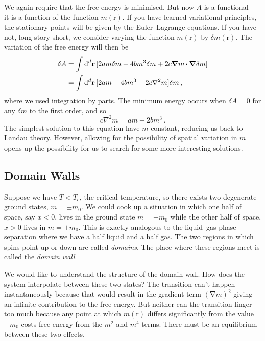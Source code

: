 \documentclass{article}
\theoremstyle{plain}\theoremheaderfont{\normalfont\bfseries}\theorembodyfont{\rmfamily}\theoremseparator{.}\newtheorem*{thm}{Theorem}\newtheorem*{law}{Law}\newtheorem*{pos}{Postulate}
\numberwithin{equation}{section}
\newcommand{\dd}[2][]{\mathrm{d}^{#1} #2\,}
\newcommand{\vb}[1]{\bm{\mathrm{#1}}}
\newcommand{\vdot}{\,\bm{\mathrm{\cdot}}\,}
\newcommand{\grad}{\vb{\nabla}}
\newcommand{\laplacian}{\nabla^2}
\begin{document}
    We again require that the free energy is minimised. But now \(A\) is a functional --- it is a function of the function \(m(\vb{r})\). If you have learned variational principles, the stationary points will be given by the Euler--Lagrange equations. If you have not, long story short, we consider varying the function \(m(\vb{r})\) by \(\delta m(\vb{r})\). The variation of the free energy will then be
    \begin{align}
        \delta A&=\int\dd[d]{\vb{r}}[2am\delta m+4bm^3\delta m+2c\grad m\vdot\grad\delta m]\notag \\
        &=\int\dd[d]{\vb{r}}[2am+4bm^3-2c\laplacian m]\delta m\,,
    \end{align}
    where we used integration by parts. The minimum energy occurs when \(\delta A=0\) for any \(\delta m\) to the first order, and so
    \begin{equation}\label{Landau_Ginzburg}
        c\laplacian m=am+2bm^3\,.
    \end{equation}
    The simplest solution to this equation have \(m\) constant, reducing us back to Landau theory. However, allowing for the possibility of spatial variation in \(m\) opens up the possibility for us to search for some more interesting solutions.

    \subsection{Domain Walls}
    Suppose we have \(T<T_c\), the critical temperature, so there exists two degenerate ground states, \(m=\pm m_0\). We could cook up a situation in which one half of space, say \(x<0\), lives in the ground state \(m=-m_0\) while the other half of space, \(x>0\) lives in \(m=+m_0\). This is exactly analogous to the liquid--gas phase separation where we have a half liquid and a half gas. The two regions in which spins point up or down are called \textit{domains}. The place where these regions meet is called the \textit{domain wall}.

    We would like to understand the structure of the domain wall. How does the system interpolate between these two states? The transition can't happen instantaneously because that would result in the gradient term \((\grad m)^2\) giving an infinite contribution to the free energy. But neither can the transition linger too much because any point at which \(m(\vb{r})\) differs significantly from the value \(\pm m_0\) costs free energy from the \(m^2\) and \(m^4\) terms. There must be an equilibrium between these two effects.
\end{document}
